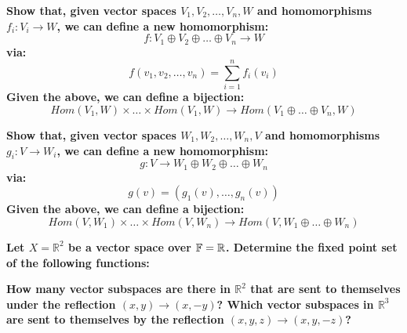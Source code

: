 \documentclass{exam}
\begin{document}
\begin{questions}
\question \textbf{Show that, given vector spaces $V_1, V_2, \ldots, V_n, W$ and homomorphisms $f_i : V_i \to W$, we can define a new homomorphism:
\[
f : V_1 \oplus V_2 \oplus \ldots \oplus V_n \to W
\]
via:
\[
f(v_1, v_2, \ldots, v_n) = \sum_{i = 1}^n f_i(v_i)
\]
Given the above, we can define a bijection:
\[
Hom(V_1, W) \times \ldots \times Hom(V_1, W) \to Hom(V_1 \oplus \ldots \oplus V_n, W)
\]}

\question \textbf{Show that, given vector spaces $W_1, W_2, \ldots, W_n, V$ and homomorphisms $g_i : V \to W_i$, we can define a new homomorphism:
\[
g : V \to W_1 \oplus W_2 \oplus \ldots \oplus W_n
\]
via:
\[
g(v) = (g_1(v), \ldots, g_n(v))
\]
Given the above, we can define a bijection:
\[
Hom(V, W_1) \times \ldots \times Hom(V, W_n) \to Hom(V, W_1 \oplus \ldots \oplus W_n)
\]}

\question \textbf{Let $X = \mathbb{R}^2$ be a vector space over $\mathbb{F} = \mathbb{R}$. Determine the fixed point set of the following functions:}


\question \textbf{How many vector subspaces are there in $\mathbb{R}^2$ that are sent to themselves under the reflection $(x,y) \to (x,-y)$? Which vector subspaces in $\mathbb{R}^3$ are sent to themselves by the reflection $(x,y,z) \to (x,y,-z)$?}

\end{questions}
\end{document}
